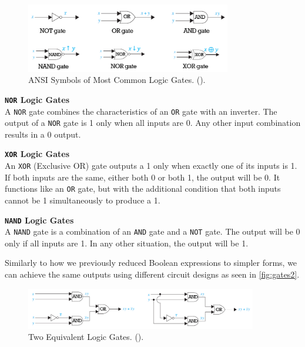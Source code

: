 \begin{figure}[h!]
    \centering
    \includegraphics[width = 0.8\textwidth]{figure/gates.png} %
    \caption{ANSI Symbols of Most Common Logic Gates. (\cite{rosen2012}).}
    \label{fig:gates}
\end{figure}

\textbf{\texttt{NOR} Logic Gates}\\
A \texttt{NOR} gate combines the characteristics of an \texttt{OR} gate with an inverter. The output of a \texttt{NOR} gate is 1 only when all inputs are 0. Any other input combination results in a 0 output.

\textbf{\texttt{XOR} Logic Gates}\\
An \texttt{XOR} (Exclusive OR) gate outputs a 1 only when exactly one of its inputs is 1. If both inputs are the same, either both 0 or both 1, the output will be 0. It functions like an \texttt{OR} gate, but with the additional condition that both inputs cannot be 1 simultaneously to produce a 1.

\textbf{\texttt{NAND} Logic Gates}\\
A \texttt{NAND} gate is a combination of an \texttt{AND} gate and a \texttt{NOT} gate. The output will be 0 only if all inputs are 1. In any other situation, the output will be 1.

Similarly to how we previously reduced Boolean expressions to simpler forms, we can achieve the same outputs using different circuit designs as seen in \autoref{fig:gates2}.

\begin{figure}[h!]
    \centering
    \includegraphics[width = 0.9\textwidth]{figure/gatessimilar.png} %
    \caption{Two Equivalent Logic Gates. (\cite{rosen2012}).}
    \label{fig:gates2}
\end{figure}

